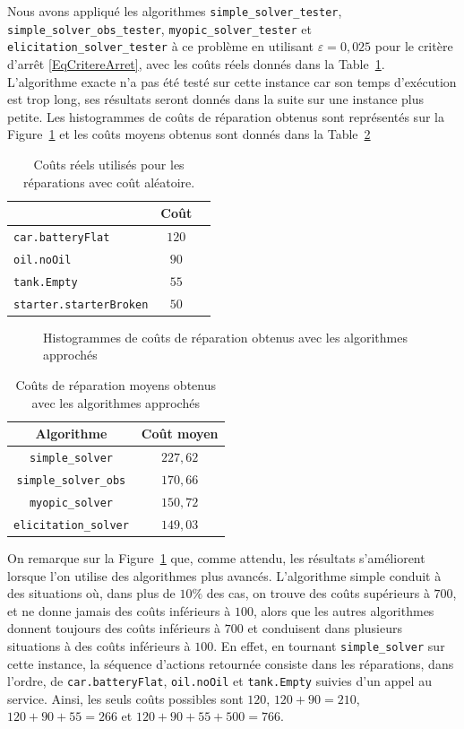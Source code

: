 \documentclass[a4paper,11pt]{article}
\theoremstyle{plain}
\theoremstyle{definition}
\begin{document}
Nous avons appliqué les algorithmes \texttt{simple\_solver\_tester}, \texttt{simple\_solver\_obs\_tester}, \texttt{myopic\_solver\_tester} et \texttt{elicitation\_solver\_tester} à ce problème en utilisant $\varepsilon = 0,025$ pour le critère d'arrêt \eqref{EqCritereArret}, avec les coûts réels donnés dans la Table~\ref{TabCoutsReels}. L'algorithme exacte n'a pas été testé sur cette instance car son temps d'exécution est trop long, ses résultats seront donnés dans la suite sur une instance plus petite. Les histogrammes de coûts de réparation obtenus sont représentés sur la Figure~\ref{FigHistogrammes} et les coûts moyens obtenus sont donnés dans la Table~\ref{TabECs}

\begin{table}[ht]
\centering
\caption{Coûts réels utilisés pour les réparations avec coût aléatoire.}
\label{TabCoutsReels}
\begin{tabular}{lcr}
\toprule
 & Coût \tabularnewline
\midrule
\texttt{car.batteryFlat} & $120$ \tabularnewline
\texttt{oil.noOil} & $90$ \tabularnewline
\texttt{tank.Empty} & $55$ \tabularnewline
\texttt{starter.starterBroken} & $50$ \tabularnewline
\bottomrule
\end{tabular}
\end{table}

\begin{figure}[ht]
\centering
\resizebox{\textwidth}{!}{}
\caption{Histogrammes de coûts de réparation obtenus avec les algorithmes approchés}
\label{FigHistogrammes}
\end{figure}

\begin{table}[ht]
\centering
\caption{Coûts de réparation moyens obtenus avec les algorithmes approchés}
\label{TabECs}
\begin{tabular}{cc}
\toprule
Algorithme & Coût moyen \tabularnewline
\midrule
\texttt{simple\_solver} & $227,62$ \tabularnewline
\texttt{simple\_solver\_obs} & $170,66$ \tabularnewline
\texttt{myopic\_solver} & $150,72$ \tabularnewline
\texttt{elicitation\_solver} & $149,03$ \tabularnewline
\bottomrule
\end{tabular}
\end{table}

On remarque sur la Figure~\ref{FigHistogrammes} que, comme attendu, les résultats s'améliorent lorsque l'on utilise des algorithmes plus avancés. L'algorithme simple conduit à des situations où, dans plus de $10\%$ des cas, on trouve des coûts supérieurs à $700$, et ne donne jamais des coûts inférieurs à $100$, alors que les autres algorithmes donnent toujours des coûts inférieurs à $700$ et conduisent dans plusieurs situations à des coûts inférieurs à $100$. En effet, en tournant \texttt{simple\_solver} sur cette instance, la séquence d'actions retournée consiste dans les réparations, dans l'ordre, de \texttt{car.batteryFlat}, \texttt{oil.noOil} et \texttt{tank.Empty} suivies d'un appel au service. Ainsi, les seuls coûts possibles sont $120$, $120+90 = 210$, $120+90+55 = 266$ et $120+90+55+500 = 766$.
\end{document}
